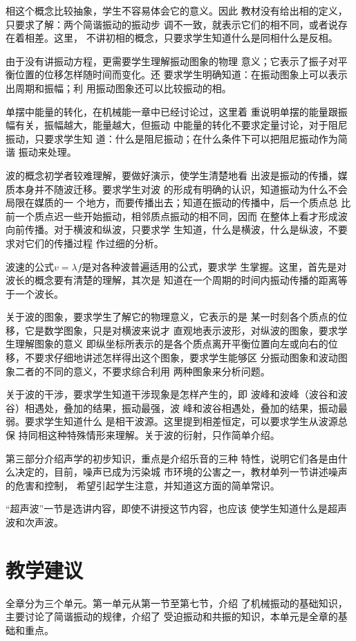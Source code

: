 相这个概念比较抽象，学生不容易体会它的意义。因此
教材没有给出相的定义，只要求了解：两个简谐振动的振动步
调不一致，就表示它们的相不同，或者说存在着相差。这里，
不讲初相的概念，只要求学生知道什么是同相什么是反相。

由于没有讲振动方程，更需要学生理解振动图象的物理
意义；它表示了振子对平衡位置的位移怎样随时间而变化。还
要求学生明确知道：在振动图象上可以表示出周期和振幅；利
用振动图象还可以比较振动的相。

单摆中能量的转化，在机械能一章中已经讨论过，这里着
重说明单摆的能量跟振幅有关，振幅越大，能量越大，但振动
中能量的转化不要求定量讨论，对于阻尼振动，只要求学生知
道：什么是阻尼振动；在什么条件下可以把阻尼振动作为简谐
振动来处理。

波的概念初学者较难理解，要做好演示，使学生清楚地看
出波是振动的传播，媒质本身并不随波迁移。要求学生对波
的形成有明确的认识，知道振动为什么不会局限在媒质的一
个地方，而要传播出去；知道在振动的传播中，后一个质点总
比前一个质点迟一些开始振动，相邻质点振动的相不同，因而
在整体上看才形成波向前传播。对于横波和纵波，只要求学
生知道，什么是横波，什么是纵波，不要求对它们的传播过程
作过细的分析。

波速的公式$v=\lambda f$是对各种波普遍适用的公式，要求学
生掌握。这里，首先是对波长的概念要有清楚的理解，其次是
知道在一个周期的时间内振动传播的距离等于一个波长。

关于波的图象，要求学生了解它的物理意义，它表示的是
某一时刻各个质点的位移，它是数学图象，只是对横波来说才
直观地表示波形，对纵波的图象，要求学生理解图象的意义
即纵坐标所表示的是各个质点离开平衡位置向左或向右的位
移，不要求仔细地讲述怎样得出这个图象，要求学生能够区
分振动图象和波动图象二者的不同的意义，不要求综合利用
两种图象来分析问题。

关于波的干涉，要求学生知道干涉现象是怎样产生的，即
波峰和波峰（波谷和波谷）相遇处，叠加的结果，振动最强，波
峰和波谷相遇处，叠加的结果，振动最弱。要求学生知道什么
是相干波源。这里提到相差恒定，可以要求学生从波源总保
持同相这种特殊情形来理解。关于波的衍射，只作简单介绍。

第三部分介绍声学的初步知识，重点是介绍乐音的三种
特性，说明它们各是由什么决定的，目前，噪声已成为污染城
市环境的公害之一，教材单列一节讲述噪声的危害和控制，
希望引起学生注意，并知道这方面的简单常识。

“超声波”一节是选讲内容，即使不讲授这节内容，也应该
使学生知道什么是超声波和次声波。

\section{教学建议}
全章分为三个单元。第一单元从第一节至第七节，介绍
了机械振动的基础知识，主要讨论了简谐振动的规律，介绍了
受迫振动和共振的知识，本单元是全章的基础和重点。

